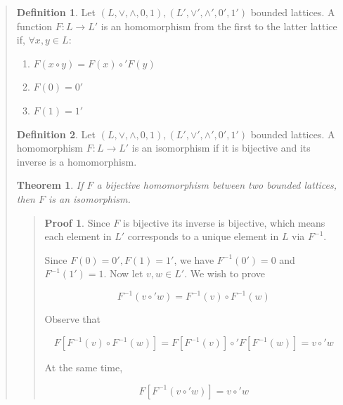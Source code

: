 \documentclass[a4paper, 12pt]{article}
\newtheorem{theorem}{Theorem}
\theoremstyle{definition}
\theoremstyle{definition}
\theoremstyle{definition}
\newtheorem{definition}{Definition}
\newtheorem{pro}{Proof}
\begin{document}
\begin{quote}
\begin{definition}
    Let $(L, \lor, \land, 0, 1), (L', \lor', \land', 0', 1')$ bounded lattices.
    A function $F : L \to L'$ is an homomorphism from the first to the latter
    lattice if, $\forall x, y \in L$:

    \begin{enumerate}
        \item $F(x \circ  y) = F(x) \circ' F(y)$
        \item $F(0) = 0'$
        \item $F(1) = 1'$
    \end{enumerate}
\end{definition}

\begin{definition}
    Let $(L, \lor, \land, 0, 1), (L', \lor', \land', 0', 1')$ bounded lattices.
    A homomorphism $F: L \to L'$ is an isomorphism if it is bijective 
    and its inverse is a homomorphism.
\end{definition}

\begin{theorem}
    If $F$ a bijective homomorphism between two bounded lattices, then $F$
    is an isomorphism.
\end{theorem}


\small
\begin{quote}

\begin{pro}
    Since $F$ is bijective its inverse is bijective, which means each element
    in $L'$ corresponds to a unique element in $L$ via $F^{-1}$.

    Since $F(0) = 0', F(1) = 1'$, we have $F^{-1}(0') = 0$ and $F^{-1}(1') =
    1$. Now let $v, w \in L'$. We wish to prove 

    \begin{equation}
        F^{-1}(v \circ' w) = F^{-1}(v) \circ F^{-1}(w)
    \end{equation}

    Observe that

    \begin{equation*}
    F \left[ F^{-1}(v) \circ F^{-1}(w) \right]  = F\left[ F^{-1}(v) \right] \circ' F\left[ F^{-1}(w) \right] 
                                                    = v \circ' w
    \end{equation*}

    At the same time, 

    \begin{equation*}
        F\left[ F^{-1}(v \circ' w) \right] = v \circ' w 
    \end{equation*}


\end{pro}
\end{quote}
\end{quote}
\end{document}
